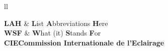\documentclass[
11pt, %
english, %
singlespacing, %
headsepline, %
]{MastersDoctoralThesis} %
\begin{document}
\tableofcontents %

\listoffigures %

\listoftables %


\begin{abbreviations}{ll} %

\textbf{LAH} & \textbf{L}ist \textbf{A}bbreviations \textbf{H}ere\\
\textbf{WSF} & \textbf{W}hat (it) \textbf{S}tands \textbf{F}or\\
\textbf{CIE}\textbf{Commission Internationale de l'Eclairage}\\
\end{abbreviations}

%
%
%
%

%
%
%
%
%
\end{document}
